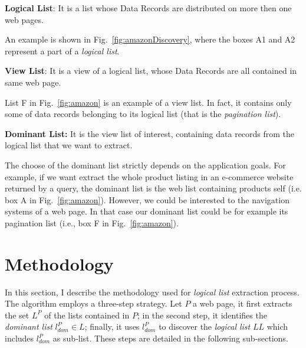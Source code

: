 \begin{definition}
\label{def:logicalList}\textbf{Logical List}:
It is a list whose Data Records are distributed on more then one web pages. 
\end{definition}
An example is shown in Fig.~\ref{fig:amazonDiscovery}, where the boxes A1 and A2 represent a part of a \emph{logical list}.
\begin{definition}
\label{def:viewList}\textbf{View List}:
It is a view of a logical list, whose Data Records are all contained in same web page.
\end{definition}
List F in Fig.~\ref{fig:amazon} is an example of a view list. In fact, it contains only some of data records belonging to its logical list (that is the \textit{pagination list}).
\begin{definition}
\label{def:domList}\textbf{Dominant List:} It is the view list of interest, containing data records from the logical list that we want to extract.
\end{definition}
The choose of the dominant list strictly depends on the application goals. For example, if we want extract the whole product listing in an e-commerce website returned by a query, the dominant list is the web list containing products self (i.e. box A in Fig.~\ref{fig:amazon}). However, we could be interested to the navigation systems of a web page. In that case our dominant list could be for example its pagination list (i.e., box F in Fig.~\ref{fig:amazon}).  


\section{Methodology}
\label{SecChap2:Methodology}
In this section, I describe the methodology used for \emph{logical list} extraction process. The algorithm employs a three-step strategy.
Let $P$ a web page, it first extracts the set $L^P$ of the lists contained in $P$; in the second step, it identifies the \textit{dominant list} $l_{dom}^P \in L$; finally, it uses $l_{dom}^P$ to discover the \emph{logical list} $LL$ which includes $l_{dom}^P$ as sub-list. 
These steps are detailed in the following sub-sections.

